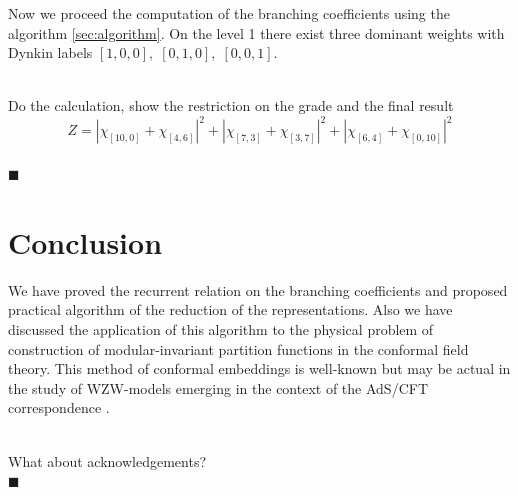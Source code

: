 \documentclass[a4paper,12pt]{article}
\theoremstyle{definition} \newtheorem{Def}{Definition}
\newenvironment{comment}
{\par\noindent{\bf TODO}\\}
{\\\hfill$\scriptstyle\blacksquare$\par}
\begin{document}
Now we proceed the computation of the branching coefficients using the algorithm \ref{sec:algorithm}. 
On the level 1 there exist three dominant weights with Dynkin labels $[1,0,0], \; [0,1,0],\; [0,0,1]$.

\begin{comment}
  Do the calculation, show the restriction on the grade and the final result
  \begin{equation}
    \label{eq:35}
    Z=\left|\chi_{[10,0]}+\chi_{[4,6]}\right|^2+\left|\chi_{[7,3]}+\chi_{[3,7]}\right|^2+\left|\chi_{[6,4]}+\chi_{[0,10]}\right|^2
  \end{equation}
\end{comment}

\section{Conclusion}
\label{sec:conclusion}
We have proved the recurrent relation on the branching coefficients and proposed practical algorithm of the reduction of the representations. Also we have discussed the application of this algorithm to the physical problem of construction of modular-invariant partition functions in the conformal field theory. This method of conformal embeddings is well-known but may be actual in the study of WZW-models emerging in the context of the AdS/CFT correspondence \cite{Maldacena:2000hw,Maldacena:2000kv,Maldacena:2001km}. 
\begin{comment}
  What about acknowledgements? 
\end{comment}
{}

\end{document}
